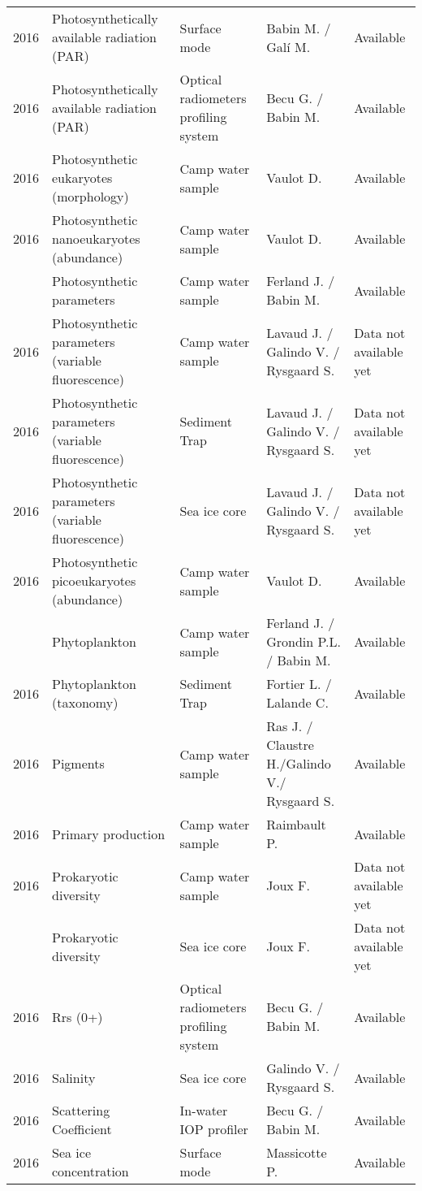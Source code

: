 \documentclass[]{article}
\begin{document}
\begin{landscape}
\begin{longtable}{rllll}
2016 & Photosynthetically available radiation (PAR) & Surface mode & Babin M. / Galí M. & Available\\
2016 & Photosynthetically available radiation (PAR) & Optical radiometers profiling system & Becu G. / Babin M. & Available\\
2016 & Photosynthetic eukaryotes (morphology) & Camp water sample & Vaulot D. & Available\\
2016 & Photosynthetic nanoeukaryotes (abundance) & Camp water sample & Vaulot D. & Available\\
\addlinespace
2016 & Photosynthetic parameters & Camp water sample & Ferland J. / Babin M. & Available\\
2016 & Photosynthetic parameters (variable fluorescence) & Camp water sample & Lavaud J. / Galindo V. / Rysgaard S. & Data not available yet\\
2016 & Photosynthetic parameters (variable fluorescence) & Sediment Trap & Lavaud J. / Galindo V. / Rysgaard S. & Data not available yet\\
2016 & Photosynthetic parameters (variable fluorescence) & Sea ice core & Lavaud J. / Galindo V. / Rysgaard S. & Data not available yet\\
2016 & Photosynthetic picoeukaryotes (abundance) & Camp water sample & Vaulot D. & Available\\
\addlinespace
2016 & Phytoplankton & Camp water sample & Ferland J. / Grondin P.L. / Babin M. & Available\\
2016 & Phytoplankton (taxonomy) & Sediment Trap & Fortier L. / Lalande C. & Available\\
2016 & Pigments & Camp water sample & Ras J. / Claustre H./Galindo V./ Rysgaard S. & Available\\
2016 & Primary production & Camp water sample & Raimbault P. & Available\\
2016 & Prokaryotic diversity & Camp water sample & Joux F. & Data not available yet\\
\addlinespace
2016 & Prokaryotic diversity & Sea ice core & Joux F. & Data not available yet\\
2016 & Rrs (0+) & Optical radiometers profiling system & Becu G. / Babin M. & Available\\
2016 & Salinity & Sea ice core & Galindo V. / Rysgaard S. & Available\\
2016 & Scattering Coefficient & In-water IOP profiler & Becu G. / Babin M. & Available\\
2016 & Sea ice concentration & Surface mode & Massicotte P. & Available\\

\end{longtable}
\end{landscape}
\end{document}
